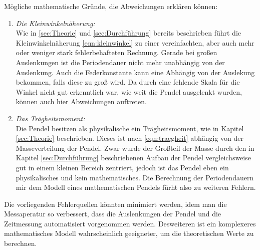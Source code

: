 Mögliche mathematische Gründe, die Abweichungen erklären können:
\begin{enumerate}
    \item \textit{Die Kleinwinkelnäherung:}\\
        Wie in \ref{sec:Theorie} und \ref{sec:Durchführung} bereits beschrieben führt die Kleinwinkelnäherung \eqref{eqn:kleinwinkel}
        zu einer vereinfachten, aber auch mehr oder weniger stark fehlerbehafteten Rechnung. Gerade bei großen Auslenkungen ist die
        Periodendauer nicht mehr unabhängig von der Auslenkung. Auch die Federkonstante kann eine Abhängig von
        der Auslekung bekommen, falls diese zu groß wird. Da durch eine fehlende Skala für die Winkel nicht gut erkenntlich war,
        wie weit die Pendel ausgelenkt wurden, können auch hier Abweichungen auftreten.
    \item \textit{Das Trägheitsmoment:}\\
        Die Pendel besitzen als physikalische ein Trägheitsmoment, wie in Kapitel \ref{sec:Theorie} beschrieben. Dieses ist nach 
        \eqref{eqn:traegheit} abhängig von der Masseverteilung der Pendel. Zwar wurde der Großteil der Masse durch den in 
        Kapitel \ref{sec:Durchführung} beschriebenen Aufbau der Pendel vergleichsweise gut in einem kleinen Bereich zentriert,
        jedoch ist das Pendel eben ein physikalisches und kein mathematisches. Die Berechnung der Periodendauern mir dem 
        Modell eines mathematischen Pendels fürht also zu weiteren Fehlern.  
\end{enumerate}
Die vorliegenden Fehlerquellen könnten minimiert werden, idem man die Messaperatur so verbessert, dass die Auslenkungen der Pendel
und die Zeitmessung automatisiert vorgenommen werden. Desweiteren ist ein komplexeres mathematisches Modell wahrscheinlich geeigneter,
um die theoretischen Werte zu berechnen.
